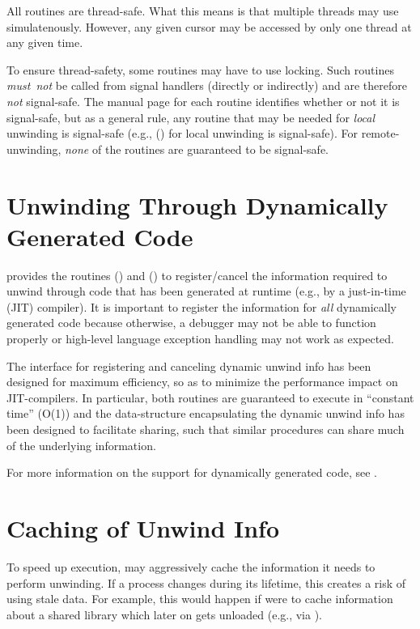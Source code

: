 \documentclass{article}
\begin{document}
All  routines are thread-safe.  What this means is
that multiple threads may use  simulatenously.
However, any given cursor may be accessed by only one thread at
any given time.

To ensure thread-safety, some  routines may have to
use locking.  Such routines \emph{must~not} be called from signal
handlers (directly or indirectly) and are therefore \emph{not}
signal-safe.  The manual page for each  routine
identifies whether or not it is signal-safe, but as a general rule,
any routine that may be needed for \emph{local} unwinding is
signal-safe (e.g., () for local unwinding is
signal-safe).  For remote-unwinding, \emph{none} of the
 routines are guaranteed to be signal-safe.


\section{Unwinding Through Dynamically Generated Code}

 provides the routines () and
() to register/cancel the information required to
unwind through code that has been generated at runtime (e.g., by a
just-in-time (JIT) compiler).  It is important to register the
information for \emph{all} dynamically generated code because
otherwise, a debugger may not be able to function properly or
high-level language exception handling may not work as expected.

The interface for registering and canceling dynamic unwind info has
been designed for maximum efficiency, so as to minimize the
performance impact on JIT-compilers.  In particular, both routines are
guaranteed to execute in ``constant time'' (O(1)) and the
data-structure encapsulating the dynamic unwind info has been designed
to facilitate sharing, such that similar procedures can share much of
the underlying information.

For more information on the  support for dynamically
generated code, see .


\section{Caching of Unwind Info}

To speed up execution,  may aggressively cache the
information it needs to perform unwinding.  If a process changes
during its lifetime, this creates a risk of  using
stale data.  For example, this would happen if  were
to cache information about a shared library which later on gets
unloaded (e.g., via ).
\end{document}
